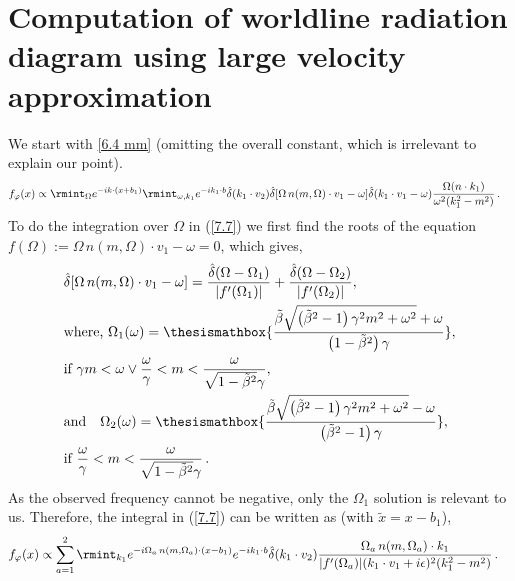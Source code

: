 \section{Computation of worldline radiation diagram using large velocity approximation}\label{ch2:app:F}
We start with \eqref{6.4 mm} (omitting the overall constant, which is irrelevant to explain our point).
\begin{align}
    \begin{split}
        f_{\varphi}(x)&\propto\rmint_{\Omega}e^{-ik\cdot (x+b_1)}\rmint_{\omega,k_1}e^{-i k_1\cdot b}\hat{\delta}(k_1\cdot v_2)\hat{\delta}[\Omega\, n(m,\Omega)\cdot v_1-\omega]\hat\delta(k_1\cdot v_1-\omega)\frac{\Omega(n\cdot k_1)}{\omega^2 (k_1^2-m^2)}\,.\label{7.7}
    \end{split}
\end{align}
To do the integration over $\Omega$ in (\ref{7.7}) we first find the roots of the equation $f(\Omega):=\Omega\, n(m,\Omega)\cdot v_1-\omega=0$, which gives,
\begin{align}
    \begin{split}
       & \hat{\delta}[\Omega\, n(m,\Omega)\cdot v_1-\omega]=\frac{\hat\delta(\Omega-\Omega_1)}{|f'(\Omega_1)|}+\frac{\hat\delta(\Omega-\Omega_2)}{|f'(\Omega_2)|},\,\, \\ &
        \text{where,}\,\, \Omega_{1}(\omega)=\thesismathbox{\displaystyle\frac{\tilde\beta  \sqrt{\left(\tilde\beta ^2-1\right) \gamma ^2 m^2+\omega ^2}+\omega }{\left(1-\tilde\beta ^2\right) \gamma }},\\ &
        \text{if }\gamma  m<\omega \lor \frac{\omega }{\gamma }<m<\frac{\omega }{\sqrt{1-\tilde\beta ^2} \gamma },\\ &
        \text{and}\quad \Omega_2(\omega)=\thesismathbox{\displaystyle\frac{\tilde\beta  \sqrt{\left(\tilde\beta ^2-1\right) \gamma ^2 m^2+\omega ^2}-\omega }{\left(\tilde\beta ^2-1\right) \gamma }},\\ &
        \text{if }\frac{\omega }{\gamma }<m<\frac{\omega }{\sqrt{1-\tilde\beta ^2} \gamma }\,.
    \end{split}
\end{align}
As the observed frequency cannot be negative, only the $\Omega_1$ solution is relevant to us. Therefore, the integral in (\ref{7.7}) can be written as (with $\tilde{x}=x-b_1$),
\begin{align}
    \begin{split}
        f_{\varphi}(x)&\propto  \sum_{a=1}^2\rmint_{k_1}e^{-i \Omega_a\, n(m,\Omega_a)\cdot (x-b_1)}e^{-ik_1\cdot b}\hat\delta(k_1\cdot v_2)\frac{\Omega_a\,n(m,\Omega_a)\cdot k_1}{|f'(\Omega_a)|(k_1\cdot v_1+i\epsilon)^2(k_1^2-m^2)}\,.
    \end{split}
\end{align}

